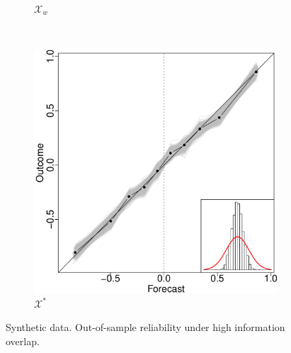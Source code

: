 \documentclass[11pt]{article}
\theoremstyle{definition}
\theoremstyle{definition}
\begin{document}
\begin{figure}[t!]
\begin{subfigure}[b]{0.323\textwidth}
                \caption{$\mathcal{X}_w$}
        \label{RelOWAHigh}
        \end{subfigure}
        ~ %
        \begin{subfigure}[b]{0.323\textwidth}
                \includegraphics[width=\textwidth]{SimDepELOP}
                \caption{$\mathcal{X}^*$ }
        \label{RelEOWAHigh}
        \end{subfigure}
          \caption{Synthetic data. Out-of-sample reliability under high information overlap. }
   \label{HighOverlap}
\end{figure}
\end{document}
